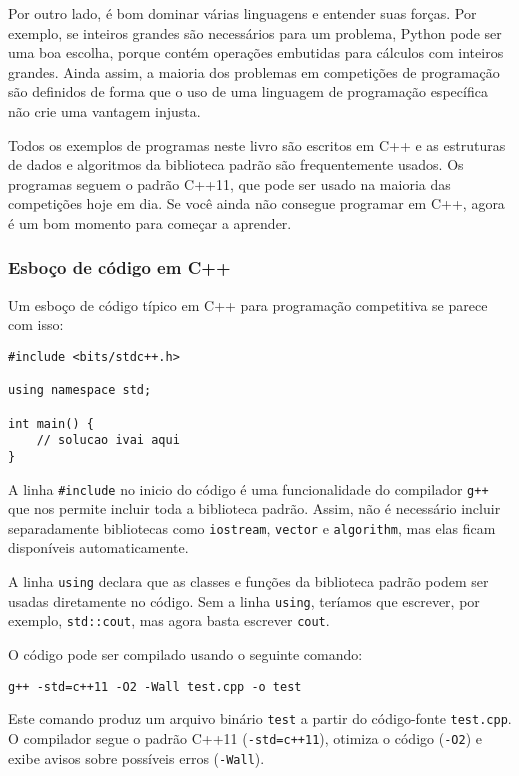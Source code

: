 Por outro lado, é bom dominar várias linguagens e entender suas forças. Por exemplo, se inteiros grandes são necessários para um problema, Python pode ser uma boa escolha, porque contém operações embutidas para cálculos com inteiros grandes. Ainda assim, a maioria dos problemas em competições de programação são definidos de forma que o uso de uma linguagem de programação específica não crie uma vantagem injusta.

Todos os exemplos de programas neste livro são escritos em C++ e as estruturas de dados e algoritmos da biblioteca padrão são frequentemente usados. Os programas seguem o padrão C++11, que pode ser usado na maioria das competições hoje em dia. Se você ainda não consegue programar em C++, agora é um bom momento para começar a aprender.

\subsubsection{Esboço de código em C++}

Um esboço de código típico em C++ para programação competitiva se parece com isso:

\begin{lstlisting}
#include <bits/stdc++.h>

using namespace std;

int main() {
    // solucao ivai aqui
}
\end{lstlisting}

A linha \texttt{\#include} no inicio do código é uma funcionalidade do compilador \texttt{g++} que nos permite incluir toda a biblioteca padrão. Assim, não é necessário incluir separadamente bibliotecas como \texttt{iostream}, \texttt{vector} e \texttt{algorithm}, mas elas ficam disponíveis automaticamente.

A linha \texttt{using} declara que as classes e funções da biblioteca padrão podem ser usadas diretamente no código. Sem a linha \texttt{using}, teríamos que escrever, por exemplo, \texttt{std::cout}, mas agora basta escrever \texttt{cout}.

O código pode ser compilado usando o seguinte comando:

\begin{lstlisting}
g++ -std=c++11 -O2 -Wall test.cpp -o test
\end{lstlisting}

Este comando produz um arquivo binário \texttt{test} a partir do código-fonte \texttt{test.cpp}. O compilador segue o padrão C++11 (\texttt{-std=c++11}), otimiza o código (\texttt{-O2}) e exibe avisos sobre possíveis erros (\texttt{-Wall}).

